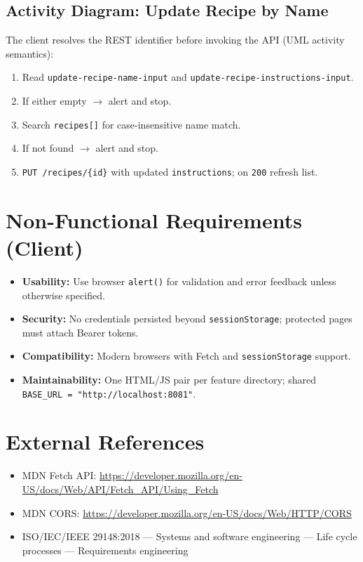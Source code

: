 \documentclass{article}
\begin{document}
\subsection{Activity Diagram: Update Recipe by Name}
The client resolves the REST identifier before invoking the API (UML activity semantics):

\begin{enumerate}[label=\arabic*., leftmargin=*]
  \item Read \texttt{update-recipe-name-input} and \texttt{update-recipe-instructions-input}.
  \item If either empty $\rightarrow$ alert and stop.
  \item Search \texttt{recipes[]} for case-insensitive name match.
  \item If not found $\rightarrow$ alert and stop.
  \item \texttt{PUT /recipes/\{id\}} with updated \texttt{instructions}; on \texttt{200} refresh list.
\end{enumerate}

\section{Non-Functional Requirements (Client)}
\begin{itemize}[noitemsep]
  \item \textbf{Usability:} Use browser \texttt{alert()} for validation and error feedback unless otherwise specified.
  \item \textbf{Security:} No credentials persisted beyond \texttt{sessionStorage}; protected pages must attach Bearer tokens.
  \item \textbf{Compatibility:} Modern browsers with Fetch and \texttt{sessionStorage} support.
  \item \textbf{Maintainability:} One HTML/JS pair per feature directory; shared \texttt{BASE\_URL = "http://localhost:8081"}.
\end{itemize}

\section{External References}
\begin{itemize}[noitemsep]
  \item MDN Fetch API: \url{https://developer.mozilla.org/en-US/docs/Web/API/Fetch_API/Using_Fetch}
  \item MDN CORS: \url{https://developer.mozilla.org/en-US/docs/Web/HTTP/CORS}
  \item ISO/IEC/IEEE 29148:2018 --- Systems and software engineering --- Life cycle processes --- Requirements engineering
\end{itemize}
\end{document}
